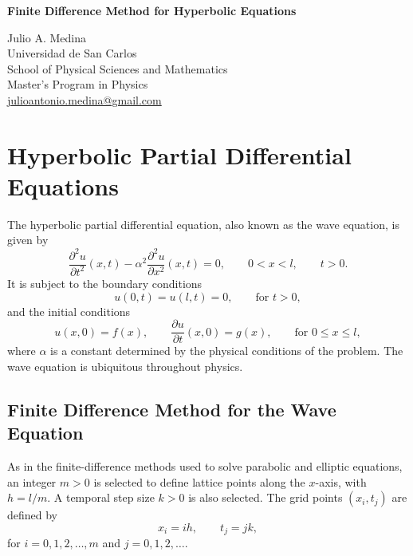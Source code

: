 \documentclass[a4paper]{article}
\begin{document}

\Large
\begin{center}
\textbf{Finite Difference Method for Hyperbolic Equations\\}

\hspace{10pt}

\large
Julio A. Medina\\
\hspace{10pt}
\small
Universidad de San Carlos\\
School of Physical Sciences and Mathematics\\
Master's Program in Physics\\
\href{mailto:julioantonio.medina@gmail.com}{julioantonio.medina@gmail.com}\\
\end{center}

\hspace{10pt}

\normalsize
\section{Hyperbolic Partial Differential Equations}

The hyperbolic partial differential equation, also known as the wave equation, is given by
\begin{equation}\label{eq::hyperbolic_partial_diff}
\frac{\partial^2 u}{\partial t^2}(x,t)-\alpha^2\frac{\partial^2 u}{\partial x^2}(x,t)=0,\qquad 0<x<l,\qquad t>0.
\end{equation}
It is subject to the boundary conditions
\begin{equation}
u(0,t)=u(l,t)=0,\qquad \text{for }t>0,
\end{equation}
and the initial conditions
\begin{equation}
u(x,0)=f(x),\qquad \frac{\partial u}{\partial t}(x,0)=g(x),\qquad \text{for }0\leq x\leq l,
\end{equation}
where $\alpha$ is a constant determined by the physical conditions of the problem. The wave equation is ubiquitous throughout physics.

\subsection{Finite Difference Method for the Wave Equation}

As in the finite-difference methods used to solve parabolic and elliptic equations, an integer $m>0$ is selected to define lattice points along the $x$-axis, with $h=l/m$. A temporal step size $k>0$ is also selected. The grid points $(x_i,t_j)$ are defined by
\begin{equation}
x_i=ih,\qquad t_j=jk,
\end{equation}
for $i=0,1,2,\ldots,m$ and $j=0,1,2,\ldots$.
\end{document}
